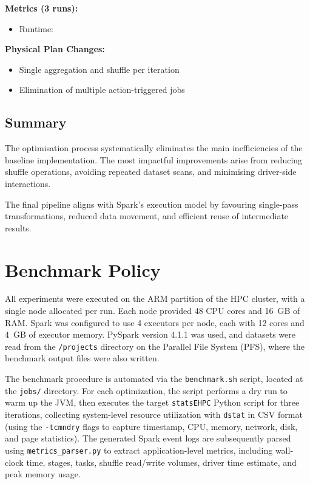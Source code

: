 \documentclass[conference,a4paper]{IEEEtran}
\begin{document}
\textbf{Metrics (3 runs):}
\begin{itemize}
    \item Runtime: \texttt{}
\end{itemize}

\textbf{Physical Plan Changes:}
\begin{itemize}
    \item Single aggregation and shuffle per iteration
    \item Elimination of multiple action-triggered jobs
\end{itemize}

\subsection{Summary}
\label{sec:optimizations_summary}

The optimisation process systematically eliminates the main inefficiencies of
the baseline implementation. The most impactful improvements arise from reducing
shuffle operations, avoiding repeated dataset scans, and minimising
driver-side interactions.

The final pipeline aligns with Spark’s execution model by favouring
single-pass transformations, reduced data movement, and efficient reuse of
intermediate results.

\section{Benchmark Policy}
\label{sec:benchmark_policy}

All experiments were executed on the ARM partition of the HPC cluster, with
a single node allocated per run. Each node provided 48 CPU cores and 16~GB of
RAM. Spark was configured to use 4 executors per node, each with 12 cores and
4~GB of executor memory. PySpark version 4.1.1 was used, and datasets were
read from the \texttt{/projects} directory on the Parallel File System (PFS),
where the benchmark output files were also written.

The benchmark procedure is automated via the \texttt{benchmark.sh} script,
located at the \texttt{jobs/} directory. For each optimization, the script
performs a dry run to warm up the JVM, then executes the target
\texttt{statsEHPC} Python script for three iterations, collecting system-level
resource utilization with \texttt{dstat} in CSV format (using the
\texttt{-tcmndry} flags to capture timestamp, CPU, memory, network, disk, and
page statistics). The generated Spark event logs are subsequently parsed using
\texttt{metrics\_parser.py} to extract application-level metrics, including
wall-clock time, stages, tasks, shuffle read/write volumes, driver time
estimate, and peak memory usage.
\end{document}
